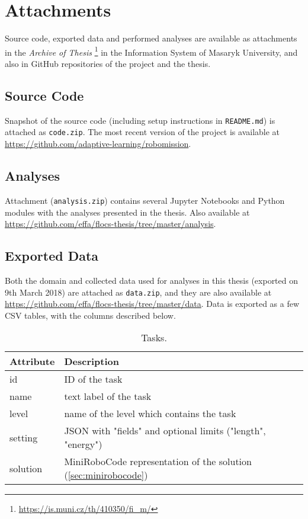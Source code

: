 \chapter{Attachments}
\label{chap:attachments}

Source code, exported data and performed analyses
are available as attachments in the \emph{Archive of Thesis}%
\footnote{\url{https://is.muni.cz/th/410350/fi\_m/}}
in the Information System of Masaryk University,
and also in GitHub repositories of the project and the thesis.

\section{Source Code}
\label{sec:attachment.source-code}

Snapshot of the source code
(including setup instructions in \texttt{README.md})
is attached as \texttt{code.zip}.
The most recent version of the project is available at
\url{https://github.com/adaptive-learning/robomission}.

\section{Analyses}
\label{sec:attachment.analyses}

Attachment (\texttt{analysis.zip})
contains several Jupyter Notebooks and Python modules with the analyses
presented in the thesis.
Also available at
\url{https://github.com/effa/flocs-thesis/tree/master/analysis}.

\section{Exported Data}
\label{sec:attachment.collected-data}

Both the domain and collected data used for analyses in this
thesis (exported on 9th March 2018) are attached as
\texttt{data.zip}, and they are also available at
\url{https://github.com/effa/flocs-thesis/tree/master/data}.
Data is exported as a few CSV tables,
with the columns described below.

\begin{table}[htb]
\centering
\caption{Tasks.}
\begin{tabular}{l l}
\toprule
Attribute & Description \\
\midrule
id & ID of the task \\
name & text label of the task \\
level & name of the level which contains the task \\
setting & JSON with "fields" and optional limits ("length", "energy") \\
solution & MiniRoboCode representation of the solution (\cref{sec:minirobocode}) \\
\bottomrule
\end{tabular}
\end{table}

